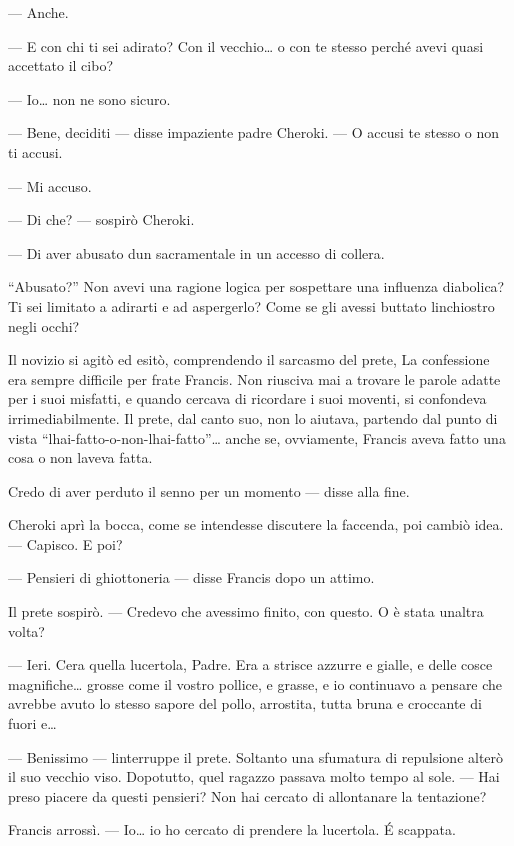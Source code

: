 --- Anche.

--- E con chi ti sei adirato? Con il vecchio\ldots{} o con te stesso
perché avevi quasi accettato il cibo?

--- Io\ldots{} non ne sono sicuro.

--- Bene, deciditi --- disse impaziente padre Cheroki. --- O accusi te
stesso o non ti accusi.

--- Mi accuso.

--- Di che? --- sospirò Cheroki.

--- Di aver abusato d\textquotesingle un sacramentale in un accesso di
collera.

``Abusato?'' Non avevi una ragione logica per sospettare una influenza
diabolica? Ti sei limitato a adirarti e ad aspergerlo? Come se gli
avessi buttato l\textquotesingle inchiostro negli occhi?

Il novizio si agitò ed esitò, comprendendo il sarcasmo del prete, La
confessione era sempre difficile per frate Francis. Non riusciva mai a
trovare le parole adatte per i suoi misfatti, e quando cercava di
ricordare i suoi moventi, si confondeva irrimediabilmente. Il prete, dal
canto suo, non lo aiutava, partendo dal punto di vista
``l\textquotesingle hai-fatto-o-non-l\textquotesingle hai-fatto''\ldots{}
anche se, ovviamente, Francis aveva fatto una cosa o non
l\textquotesingle aveva fatta.

Credo di aver perduto il senno per un momento --- disse alla fine.

Cheroki aprì la bocca, come se intendesse discutere la faccenda, poi
cambiò idea. --- Capisco. E poi?

--- Pensieri di ghiottoneria --- disse Francis dopo un attimo.

Il prete sospirò. --- Credevo che avessimo finito, con questo. O è stata
un\textquotesingle altra volta?

--- Ieri. C\textquotesingle era quella lucertola, Padre. Era a strisce
azzurre e gialle, e delle cosce magnifiche\ldots{} grosse come il vostro
pollice, e grasse, e io continuavo a pensare che avrebbe avuto lo stesso
sapore del pollo, arrostita, tutta bruna e croccante di fuori e\ldots{}

--- Benissimo --- l\textquotesingle interruppe il prete. Soltanto una
sfumatura di repulsione alterò il suo vecchio viso. Dopotutto, quel
ragazzo passava molto tempo al sole. --- Hai preso piacere da questi
pensieri? Non hai cercato di allontanare la tentazione?

Francis arrossì. --- Io\ldots{} io ho cercato di prendere la lucertola.
É scappata.

